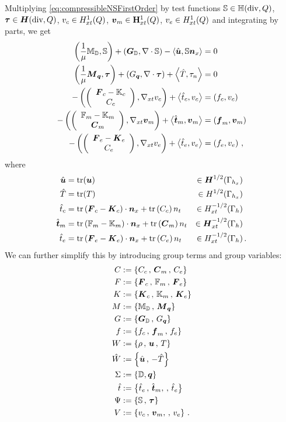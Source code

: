 \documentclass[Dissertation.tex]{subfiles}
\begin{document}
Multiplying \eqref{eq:compressibleNSFirstOrder} by test functions $\bbS\in\bbH(\text{div},Q)$,
$\bftau\in\HdivxQ$, $v_c\in\HonextQ$, $\bfv_m\in\mathbf{H}_{xt}^1(Q)$, $v_e\in\HonextQ$ and integrating by parts,
we get
\begin{subequations}
\label{eq:compressibleNSNonlinear}
\begin{align}
	\LRp{\frac{1}{\mu}\bbM_\bbD,\bbS}+\LRp{\bfG_\bbD,\Div\bbS}-\LRa{\hat\bfu,\bbS\bfn_x}&=0\\
	\LRp{\frac{1}{\mu}\bfM_{\bfq},\bftau}+\LRp{G_{\bfq},\Div\bftau}+\LRa{\hat T,\tau_n}&=0\\
	-\LRp{\vecttwo{\bfF_c-\bbK_c}{C_c},\Gradxt v_c}+\LRa{\hat t_c,v_c}&=\LRp{f_c,v_c}\\
	-\LRp{\vecttwo{\bbF_m-\bbK_m}{\bfC_m},\Gradxt\bfv_m}+\LRa{\hat\bft_m,\bfv_m}&=\LRp{\bff_m,\bfv_m}\\
	-\LRp{\vecttwo{\bfF_e-\bfK_e}{C_e},\Gradxt v_e}+\LRa{\hat t_e,v_e}&=\LRp{f_e,v_e}\,,
\end{align}
\end{subequations}
where 
\begin{equation*}
\begin{aligned}
\hat\bfu&=\trace(\bfu)
&\in \bfH^{1/2}(\Gamma_{h_x})&\\
\hat T&=\trace(T)
&\in H^{1/2}(\Gamma_{h_x})&\\
\hat t_c&=\trace\LRp{\bfF_c-\bfK_c}\cdot\bfn_x+\trace\LRp{C_c}n_t
&\in H^{-1/2}_{xt}(\Gamma_h)&\\
\hat\bft_m&=\trace\LRp{\bbF_m-\bbK_m}\cdot\bfn_x+\trace\LRp{\bfC_m} n_t
&\in \bfH^{-1/2}_{xt}(\Gamma_h)&\\
\hat t_e&=\trace\LRp{\bfF_e-\bfK_e}\cdot\bfn_x+\trace\LRp{C_e}n_t
&\in H^{-1/2}_{xt}(\Gamma_h)&\,.
\end{aligned}
\end{equation*}
We can further simplify this by introducing group terms and group variables:
\begin{align*}
C&:=\LRc{C_c\,,\, \bfC_m\,,\, C_e}\\
F&:=\LRc{\bfF_c\,,\, \bbF_m\,,\, \bfF_e}\\
K&:=\LRc{\bfK_c\,,\, \bbK_m\,,\, \bfK_e}\\
M&:=\LRc{\bbM_{\bbD}\,,\, \bfM_{\bfq}}\\
G&:=\LRc{\bfG_{\bbD}\,,\, G_{\bfq}}\\
f&:=\LRc{f_c\,,\, \bff_m\,,\, f_e}\\
W&:=\LRc{\rho\,,\,\bfu\,,\,T}\\
\hat W&:=\LRc{\hat\bfu\,,\,-\hat T}\\
\Sigma&:=\LRc{\bbD,\bfq}\\
\hat t&:=\LRc{\hat t_e\,,\,\hat\bft_m,\,,\,\hat t_e}\\
\Psi&:=\LRc{\bbS\,,\,\bftau}\\
V&:=\LRc{v_c\,,\,\bfv_m,\,,\,v_e}\,.
\end{align*}
\end{document}
